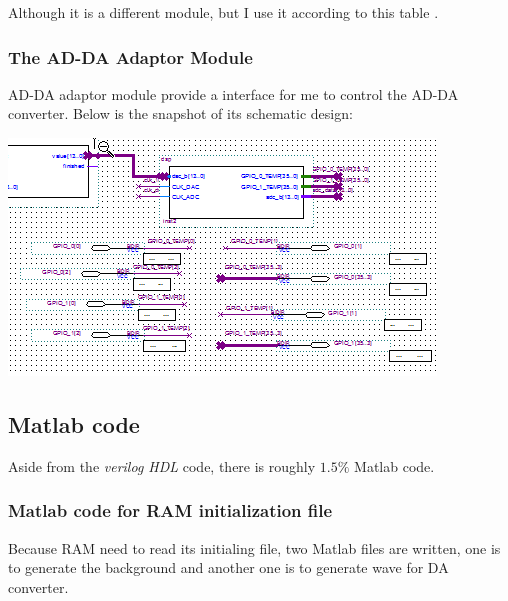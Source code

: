 \documentclass[11pt]{scrartcl}
\begin{document}
Although it is a different module, but I use it according to this table \cite{vgaadaptor}.

\subsubsection{The AD-DA Adaptor Module}
\label{sec:adda}
AD-DA adaptor module provide a interface for me to control the AD-DA converter. Below is the snapshot of its schematic design:

\begin{minipage}[t]{\linewidth}

{
\includegraphics[scale = 1]{adda.png}
}
\end{minipage}
\medskip

\subsection{Matlab code}

Aside from the \textit{verilog HDL} code, there is roughly $1.5\%$ Matlab code.   
\subsubsection{Matlab code for RAM initialization file} 
\label{sec:correct}
Because RAM need to read its initialing file, two Matlab files are written, one is to generate the background and another one is to generate wave for DA converter.\\
\end{document}
